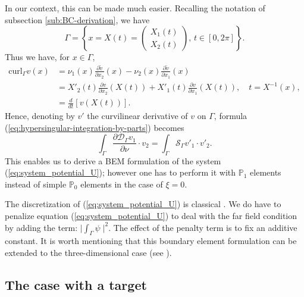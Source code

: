 \documentclass[final]{siamltex}
\newcommand{\ds}{\displaystyle}
\numberwithin{equation}{section}
\numberwithin{figure}{section}
\numberwithin{table}{section}
\begin{document}
In our context, this can be made much easier. Recalling the
notation of subsection \ref{sub:BC-derivation}, we have
\[
\Gamma=\left\{ x=X(t)=\left(\begin{array}{c}
X_{1}(t)\\
X_{2}(t)
\end{array}\right),\, t\in[0,2\pi]\right\} .
\]
Thus we have, for $x\in\Gamma$,
\[
\begin{alignedat}{1}\textrm{curl}_{\Gamma}v(x) & =\nu_{1}(x)\frac{\partial\tilde{v}}{\partial x_{2}}(x)
-\nu_{2}(x)\frac{\partial\tilde{v}}{\partial x_{1}} (x)\\
 & =X'_{2}(t)\frac{\partial v}{\partial x_{2}}(X(t))+X'_{1}(t)\frac{\partial v}{\partial x_{1}}(X(t)), \quad t=X^{-1}(x),\\
 & =\frac{d}{dt}\left[v(X(t))\right].
\end{alignedat}
\]
Hence, denoting by $v'$ the curvilinear derivative of $v$ on
$\Gamma$, formula (\ref{eq:hypersingular-integration-by-parts})
becomes
\[
\int_\Gamma \frac{\partial\mathcal{D}_{\Gamma} v_{1}}{\partial\nu}
\cdot v_{2} = \int_\Gamma \mathcal{S}_{\Gamma}v'_{1} \cdot v'_{2}.
\]
This enables us to derive a BEM formulation of the system
(\ref{eq:system_potential_U}); however one has to perform it with
$\mathbb{P}_{1}$ elements instead of simple $\mathbb{P}_{0}$
elements in the case of $\xi=0$.

The discretization of (\ref{eq:system_potential_U}) is classical
\cite{steinbach2008numerical}. We do have to penalize equation
(\ref{eq:system_potential_U}) to deal with the far field condition
by adding the term: $\ds \big|\int_{\Gamma} \psi\; \big|^2$. The
effect of the penalty term is to fix an additive constant. It is
worth mentioning  that this boundary element formulation can be
extended to the three-dimensional case (see
\cite{nedelec1982integral}).

\subsection{The case with a target}
\end{document}
